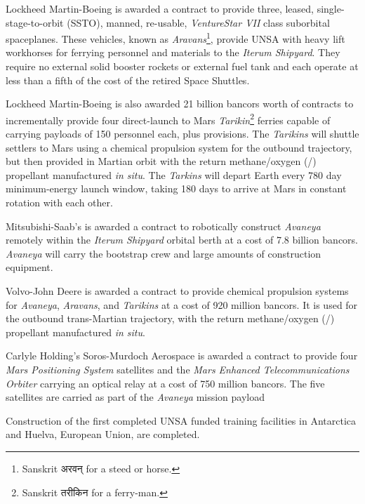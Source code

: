 Lockheed Martin-Boeing is awarded a contract to provide three, leased, single-stage-to-orbit (SSTO), manned, re-usable, {\it VentureStar VII} class suborbital spaceplanes. These vehicles, known as {\it Aravans}\footnote{Sanskrit अरवन् for a steed or horse.}, provide UNSA with heavy lift workhorses for ferrying personnel and materials to the {\it Iterum Shipyard}. They require no external solid booster rockets or external fuel tank and each operate at less than a fifth of the cost of the retired Space Shuttles.

Lockheed Martin-Boeing is also awarded 21 billion bancors worth of contracts to incrementally provide four direct-launch to Mars {\it Tarikin}\footnote{Sanskrit तरीकिन for a ferry-man.} ferries capable of carrying payloads of 150 personnel each, plus provisions. The {\it Tarikins} will shuttle settlers to Mars using a chemical propulsion system for the outbound trajectory, but then provided in Martian orbit with the return methane/oxygen (/) propellant manufactured {\it in situ}. The {\it Tarkins} will depart Earth every 780 day minimum-energy launch window, taking 180 days to arrive at Mars in constant rotation with each other.

Mitsubishi-Saab's is awarded a contract to robotically construct {\it Avaneya} remotely within the {\it Iterum Shipyard} orbital berth at a cost of 7.8 billion bancors. {\it Avaneya} will carry the bootstrap crew and large amounts of construction equipment.

Volvo-John Deere is awarded a contract to provide chemical propulsion systems for {\it Avaneya}, {\it Aravans}, and {\it Tarikins} at a cost of 920 million bancors. It is used for the outbound trans-Martian trajectory, with the return methane/oxygen (/) propellant manufactured {\it in situ}.

Carlyle Holding's Soros-Murdoch Aerospace is awarded a contract to provide four {\it Mars Positioning System} satellites and the {\it Mars Enhanced Telecommunications Orbiter} carrying an optical relay at a cost of 750 million bancors. The five satellites are carried as part of the {\it Avaneya} mission payload
\StopTimelineDate

Construction of the first completed UNSA funded training facilities in Antarctica and Huelva, European Union, are completed.
\StopTimelineDate

